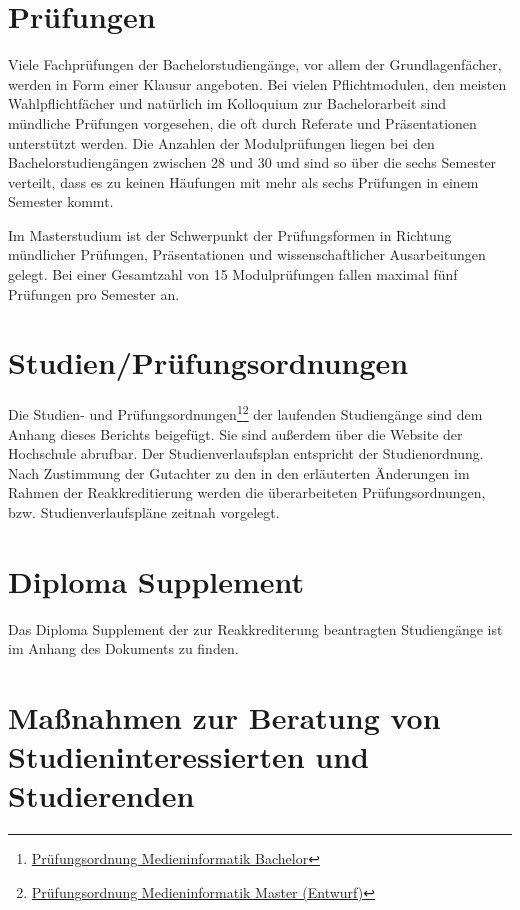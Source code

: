 \section{Prüfungen}\label{pruxfcfungen}

Viele Fachprüfungen der Bachelorstudiengänge, vor allem der
Grundlagenfächer, werden in Form einer Klausur angeboten. Bei vielen
Pflichtmodulen, den meisten Wahlpflichtfächer und natürlich im
Kolloquium zur Bachelorarbeit sind mündliche Prüfungen vorgesehen, die
oft durch Referate und Präsentationen unterstützt werden. Die Anzahlen
der Modulprüfungen liegen bei den Bachelorstudiengängen zwischen 28 und
30 und sind so über die sechs Semester verteilt, dass es zu keinen
Häufungen mit mehr als sechs Prüfungen in einem Semester kommt.

Im Masterstudium ist der Schwerpunkt der Prüfungsformen in Richtung
mündlicher Prüfungen, Präsentationen und wissenschaftlicher
Ausarbeitungen gelegt. Bei einer Gesamtzahl von 15 Modulprüfungen fallen
maximal fünf Prüfungen pro Semester an.

\section{Studien/Prüfungsordnungen}\label{studienpruxfcfungsordnungen}

Die Studien- und Prüfungsordnungen\footnote{\href{https://www.th-koeln.de/studium/medieninformatik-bachelor--ordnungen-und-formulare_3963.php}{Prüfungsordnung
  Medieninformatik Bachelor}}\footnote{\href{https://th-koeln.github.io/mi-2017/anhaenge/ma-MIMPO_Entwurf_20170218.pdf}{Prüfungsordnung
  Medieninformatik Master (Entwurf)}} der laufenden Studiengänge sind
dem Anhang dieses Berichts beigefügt. Sie sind außerdem über die Website
der Hochschule abrufbar. Der Studienverlaufsplan entspricht der
Studienordnung. Nach Zustimmung der Gutachter zu den in den erläuterten
Änderungen im Rahmen der Reakkreditierung werden die überarbeiteten
Prüfungsordnungen, bzw. Studienverlaufspläne zeitnah vorgelegt.

\section{Diploma Supplement}\label{diploma-supplement}

Das Diploma Supplement der zur Reakkrediterung beantragten Studiengänge
ist im Anhang des Dokuments zu finden.

\section{Maßnahmen zur Beratung von Studieninteressierten und
Studierenden}\label{mauxdfnahmen-zur-beratung-von-studieninteressierten-und-studierenden}

